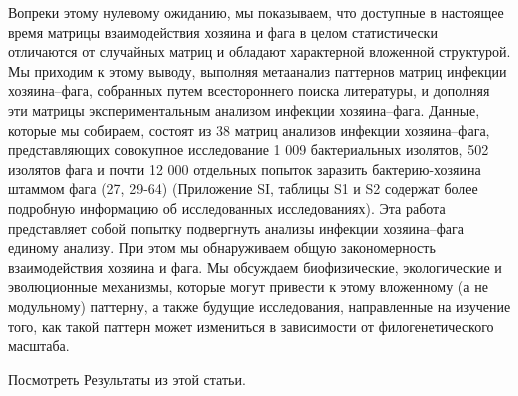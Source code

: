 \documentclass[a4paper,12pt]{article}
\begin{document}
    \par{Вопреки этому нулевому ожиданию, мы показываем, что доступные в настоящее время матрицы взаимодействия хозяина
    и фага в целом статистически отличаются от случайных матриц и обладают характерной вложенной структурой. Мы
    приходим к этому выводу, выполняя метаанализ паттернов матриц инфекции хозяина–фага, собранных путем всестороннего
    поиска литературы, и дополняя эти матрицы экспериментальным анализом инфекции хозяина–фага. Данные, которые мы
    собираем, состоят из 38 матриц анализов инфекции хозяина–фага, представляющих совокупное исследование 1 009
    бактериальных изолятов, 502 изолятов фага и почти 12 000 отдельных попыток заразить бактерию-хозяина штаммом фага
    (27, 29-64) (Приложение SI, таблицы S1 и S2 содержат более подробную информацию об исследованных исследованиях).
    Эта работа представляет собой попытку подвергнуть анализы инфекции хозяина–фага единому анализу. При этом мы
    обнаруживаем общую закономерность взаимодействия хозяина и фага. Мы обсуждаем биофизические, экологические и
    эволюционные механизмы, которые могут привести к этому вложенному (а не модульному) паттерну, а также будущие
    исследования, направленные на изучение того, как такой паттерн может измениться в зависимости от филогенетического
    масштаба.}
    
    \par{{\Large Посмотреть Результаты из этой статьи.}}
    
\end{document}
